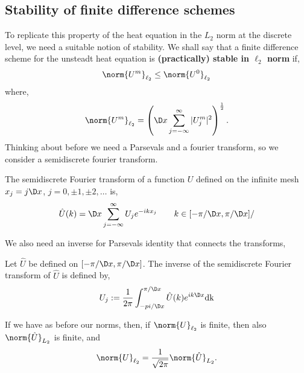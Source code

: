
\subsection{Stability of finite difference schemes}
To replicate this property of the heat equation in the $L_2$ norm at the discrete level, we need a suitable notion of stability. We shall say that a finite difference scheme for the unsteadt heat equation is \textbf{(practically) stable in $\ell_2$ norm} if,
$$ \norm{U^m}_{\ell_2} \le \norm{U^0}_{\ell_2} $$
where,
$$ \norm{U^m}_{\ell_2} = \left( \D x \sum_{j=-\infty}^\infty |U_j^m|^2 \right)^{\frac{1}{2}}. $$
\noindent
Thinking about before we need a Parsevals and a fourier transform, so we consider a semidiscrete fourier transform.
\begin{ndefi}[]
  The semidiscrete Fourier transform of a function $U$ defined on the infinite mesh $x_j = j\D x$, $j = 0, \pm 1, \pm 2, \dots$ is,
  $$ \hat U(k) = \D x \sum_{j=-\infty}^\infty U_j e^{-i kx_j} \qquad k \in [-\pi / \D x, \pi / \D x]/ $$
\end{ndefi}

We also need an inverse for Parsevals identity that connects the transforms,
\begin{ndefi}[]
  Let $\hat U$ be defined on $[-\pi / \D x, \pi / \D x]$. The inverse of the semidiscrete Fourier transform of $\hat U$ is defined by,
  $$ U_j := \frac{1}{2\pi} \int_{-pi / \D x}^{\pi / \D x} \hat U(k)e^{i k \D x} \rm d k $$
\end{ndefi}

\begin{nlemma}
  If we have as before our norms, then, if $\norm{U}_{\ell_2}$ is finite, then also $\norm{\hat U}_{L_2}$ is finite, and
  $$ \norm{U}_{\ell_2} = \frac{1}{\sqrt{2\pi}} \norm{\hat U}_{L_2}. $$
\end{nlemma}

